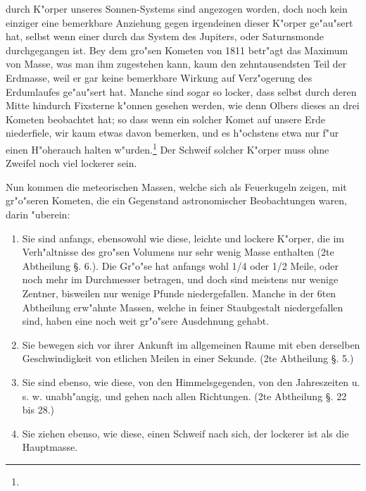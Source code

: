 \documentclass[a4paper, 11pt, oneside, polutonikogreek, german]{article}
\begin{document}
durch K"orper unseres Sonnen-Systems sind angezogen worden, doch noch kein einziger eine bemerkbare Anziehung gegen irgendeinen dieser K"orper ge"au"sert hat, selbst wenn einer durch das System des Jupiters, oder Saturnsmonde durchgegangen ist. Bey dem gro"sen Kometen von 1811 betr"agt das Maximum von Masse, was man ihm zugestehen kann, kaum den zehntausendsten Teil der Erdmasse, weil er gar keine bemerkbare Wirkung auf Verz"ogerung des Erdumlaufes ge"au"sert hat. Manche sind sogar so locker, dass selbst durch deren Mitte hindurch Fixsterne k"onnen gesehen werden, wie denn Olbers dieses an drei Kometen beobachtet hat; so dass wenn ein solcher Komet auf unsere Erde niederfiele, wir kaum etwas davon bemerken, und es h"ochstens etwa nur f"ur einen H"oherauch halten w"urden.\footnote{} Der Schweif solcher K"orper muss ohne Zweifel noch viel lockerer sein.

Nun kommen die meteorischen Massen, welche sich als Feuerkugeln zeigen, mit gr"o"seren Kometen, die ein Gegenstand astronomischer Beobachtungen waren, darin "uberein:
\begin{enumerate}
    \item Sie sind anfangs, ebensowohl wie diese, leichte und lockere K"orper, die im Verh"altnisse des gro"sen Volumens nur sehr wenig Masse enthalten (2te Abtheilung §. 6.). Die Gr"o"se hat anfangs wohl 1/4 oder 1/2 Meile, oder noch mehr im Durchmesser betragen, und doch sind meistens nur wenige Zentner, bisweilen nur wenige Pfunde niedergefallen. Manche in der 6ten Abtheilung erw"ahnte Massen, welche in feiner Staubgestalt niedergefallen sind, haben eine noch weit gr"o"sere Ausdehnung gehabt.
    \item Sie bewegen sich vor ihrer Ankunft im allgemeinen Raume mit eben derselben Geschwindigkeit von etlichen Meilen in einer Sekunde. (2te Abtheilung §. 5.)
    \item Sie sind ebenso, wie diese, von den Himmelsgegenden, von den Jahreszeiten u. s. w. unabh"angig, und gehen nach allen Richtungen. (2te Abtheilung §. 22 bis 28.)
    \item Sie ziehen ebenso, wie diese, einen Schweif nach sich, der lockerer ist als die Hauptmasse.
\end{enumerate}
\end{document}
